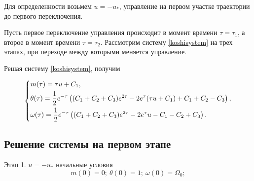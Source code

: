 \documentclass[a4paper,12pt, openany]{book}
\theoremstyle{plain} %
\theoremstyle{definition} %
\theoremstyle{remark} %
\numberwithin{equation}{chapter}
\begin{document}
{Для определенности возьмем $u=-u_\ast$, управление на первом участке траектории до первого переключения.

Пусть первое переключение управления происходит в момент времени
$\tau=\tau_1$, а второе в момент времени
$\tau=\tau_2$. Рассмотрим систему \eqref{koshisystem} на трех этапах,
при переходе между которыми меняется управление.

Решая систему \eqref{koshisystem}, получим

\begin{equation}\label{solvekoshi}
    \left\{ {\begin{aligned}
                 & m(\tau) = \tau u+C_1, \hfill                                                            \\
                 & \theta(\tau) = \frac{1}{2} e^{-\tau } \left((C_1+C_2+C_3) e^{2 \tau }-2 e^{\tau } (\tau
                u+C_1)+C_1+C_2-C_3\right), \hfill                                                          \\
                 & \omega(\tau) = \frac{1}{2} e^{-\tau } \left((C_1+C_2+C_3) e^{2 \tau }-2 e^{\tau }
                u-C_1-C_2+C_3\right). \hfill                                                               \\
            \end{aligned}} \right.
\end{equation}

\subsection*{Решение системы на первом этапе}
Этап 1. $u=-u_*$ начальные условия
\[
    m(0)=0;\ \theta(0)=1;\ \omega(0)=\Omega_0;
\]

}
\end{document}
